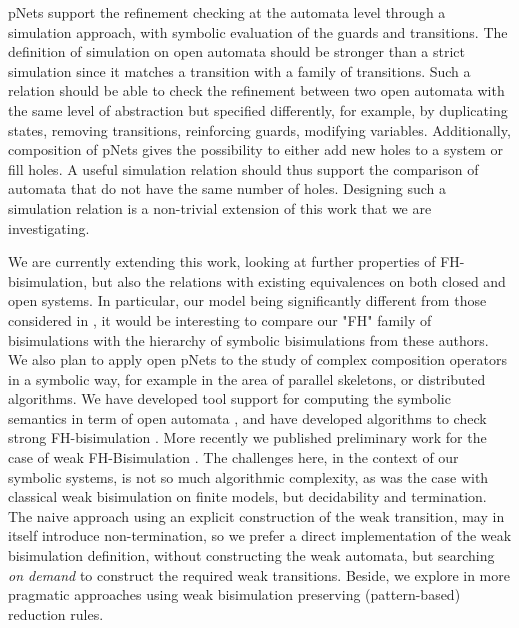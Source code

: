 \documentclass{elsarticle}
\begin{document}
pNets support the refinement checking at the automata level through a simulation approach, with symbolic evaluation of
the guards and transitions. 
 The definition of simulation on open automata should be  stronger than a strict simulation since it matches a transition with a family of transitions. Such a relation should be able to check the refinement between two open automata with the same level of abstraction but specified differently, for example, by duplicating states, removing transitions, reinforcing guards, modifying variables. Additionally, composition of 
pNets gives the possibility to either add new holes to a system or  fill holes. A useful simulation relation  should thus support the  comparison of automata that do not have the same number of holes. Designing such a simulation relation is a non-trivial extension of this work that we are investigating.

We are currently extending this work,  looking at further properties of FH-bisimulation, but also
the relations with existing equivalences on both closed and open systems. In particular, our model being significantly different from those considered in \cite{IngolfsdottirL:2001}, it
would be interesting to compare our "FH" family of bisimulations with the hierarchy of symbolic bisimulations from these authors.
We also plan to apply open pNets to the study of complex composition
operators in a symbolic way, for example in the area of parallel
skeletons, or distributed algorithms.
We have developed tool support for computing the
symbolic semantics in term of open automata \cite{QBMZ-AVOCS18}, and have
developed algorithms to check strong FH-bisimulation \cite{hou:hal-02406098}.
More recently we published preliminary work for the case of weak FH-Bisimulation \cite{}. 
The challenges here, in the context of our symbolic systems, is not so much algorithmic complexity,
as was the case with classical weak bisimulation on finite models, but decidability and termination.
The naive approach using an explicit construction of the weak transition, may in itself introduce non-termination,
so we prefer a direct implementation of the weak bisimulation definition, without
constructing the weak automata, but searching \emph{on demand} to construct the required weak transitions.
Beside, we explore in \cite{wang:hal-03126313} more pragmatic approaches using weak bisimulation preserving (pattern-based) 
reduction rules.





% 

\end{document}
